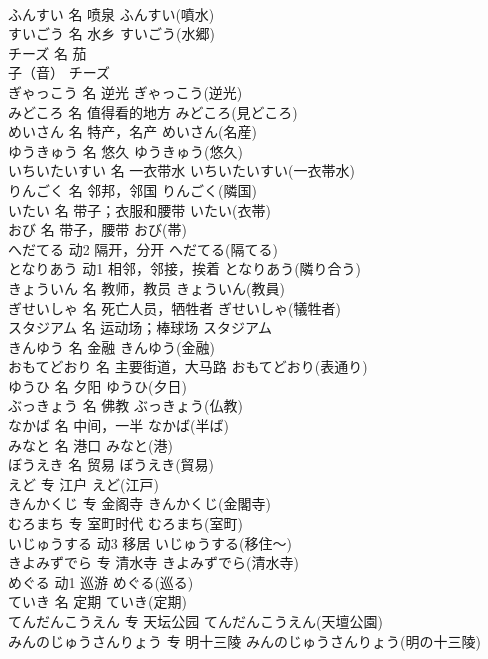 \documentclass[8pt]{extreport}
\begin{document}
\begin{CJK}{UTF8}{min}
\\	ふんすい	名	喷泉	ふんすい(噴水)	
\\	すいごう	名	水乡	すいごう(水郷)	
\\	チーズ	名	茄
\\	子（音）	チーズ	
\\	ぎゃっこう	名	逆光	ぎゃっこう(逆光)	
\\	みどころ	名	值得看的地方	みどころ(見どころ)	
\\	めいさん	名	特产，名产	めいさん(名産)	
\\	ゆうきゅう	名	悠久	ゆうきゅう(悠久)	
\\	いちいたいすい	名	一衣带水	いちいたいすい(一衣帯水)	
\\	りんごく	名	邻邦，邻国	りんごく(隣国)	
\\	いたい	名	带子；衣服和腰带	いたい(衣帯)	
\\	おび	名	带子，腰带	おび(帯)	
\\	へだてる	动2	隔开，分开	へだてる(隔てる)	
\\	となりあう	动1	相邻，邻接，挨着	となりあう(隣り合う)	
\\	きょういん	名	教师，教员	きょういん(教員)	
\\	ぎせいしゃ	名	死亡人员，牺牲者	ぎせいしゃ(犠牲者)	
\\	スタジアム	名	运动场；棒球场	スタジアム	
\\	きんゆう	名	金融	きんゆう(金融)	
\\	おもてどおり	名	主要街道，大马路	おもてどおり(表通り)	
\\	ゆうひ	名	夕阳	ゆうひ(夕日)	
\\	ぶっきょう	名	佛教	ぶっきょう(仏教)	
\\	なかば	名	中间，一半	なかば(半ば)	
\\	みなと	名	港口	みなと(港)	
\\	ぼうえき	名	贸易	ぼうえき(貿易)	
\\	えど	专	江户	えど(江戸)	
\\	きんかくじ	专	金阁寺	きんかくじ(金閣寺)	
\\	むろまち	专	室町时代	むろまち(室町)	
\\	いじゅうする	动3	移居	いじゅうする(移住～)	
\\	きよみずでら	专	清水寺	きよみずでら(清水寺)	
\\	めぐる	动1	巡游	めぐる(巡る)	
\\	ていき	名	定期	ていき(定期)	
\\	てんだんこうえん	专	天坛公园	てんだんこうえん(天壇公園)	
\\	みんのじゅうさんりょう	专	明十三陵	みんのじゅうさんりょう(明の十三陵)	

\end{CJK}
\end{document}
